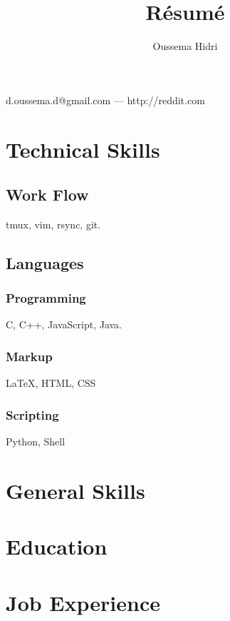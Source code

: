 \documentclass{article}
\makeatletter
\renewcommand{\maketitle}{
\begin{center}
{\huge\bfseries
\theauthor}

\vspace{.25em}

d.oussema.d@gmail.com --- http://reddit.com
\end{center}
}
\makeatother
\begin{document}
\title{R\'esum\'e}
\author{Oussema Hidri}

\maketitle


\section{Technical Skills}

\subsection{Work Flow}
tmux, vim, rsync, git.

\subsection{Languages}

\subsubsection{Programming} 

C, C++, JavaScript, Java.

\subsubsection{Markup}

{\LaTeX}, HTML, CSS 

\subsubsection{Scripting} 

Python, Shell

\section{General Skills}

\section{Education}

\section{Job Experience}
\end{document}
